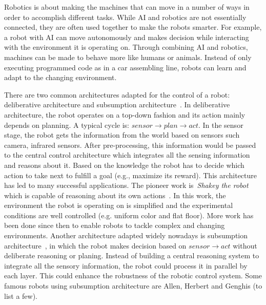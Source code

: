 Robotics is about making the machines that can move in a number of ways in order to accomplish different tasks. While AI and robotics are not essentially connected, they are often used together to make the robots smarter. For example, a robot with AI can move autonomously and makes decision while interacting with the environment it is operating on. Through combining AI and robotics, machines can be made to behave more like humans or animals. Instead of only executing programmed code as in a car assembling line, robots can learn and adapt to the changing environment.

There are two common architectures adapted for the control of a robot: deliberative architecture and subsumption architecture~\cite{Brooks1986}. In deliberative architecture, the robot operates on a top-down fashion and its action mainly depends on planning. A typical cycle is: $sensor \rightarrow plan \rightarrow act$. In the sensor stage, the robot gets the information from the world based on sensors such camera, infrared sensors. After pre-processing, this information would be passed to the central control architecture which integrates all the sensing information and reasons about it. Based on the knowledge the robot has to decide which action to take next to fulfill a goal (e.g., maximize its reward). This architecture has led to many successful applications. The pioneer work is~\textit{Shakey the robot} which is capable of reasoning about its own actions~\cite{Nilsson1984}. In this work, the environment the robot is operating on is simplified and the experimental conditions are well controlled (e.g. uniform color and flat floor). More work has been done since then to enable robots to tackle complex and changing environments. Another architecture adapted widely nowadays is subsumption architecture~\cite{Brooks1986}, in which the robot makes decision based on $sensor \rightarrow act$ without deliberate reasoning or planing. Instead of building a central reasoning system to integrate all the sensory information, the robot could process it in parallel by each layer. This could enhance the robustness of the robotic control system.  Some famous robots using subsumption architecture are Allen, Herbert and Genghis (to list a few). 
 
